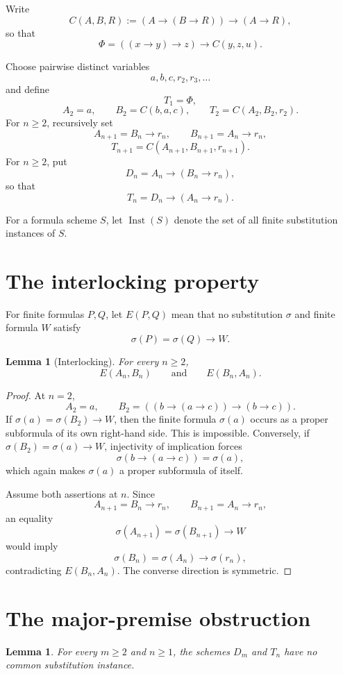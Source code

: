 \documentclass[11pt]{article}
\newtheorem{lemma}[theorem]{Lemma}
\newcommand{\Imp}{\mathbin{\to}}
\newcommand{\Inst}{\operatorname{Inst}}
\begin{document}
Write
\[
C(A,B,R):=(A\Imp(B\Imp R))\Imp(A\Imp R),
\]
so that
\[
\Phi=((x\Imp y)\Imp z)\Imp C(y,z,u).
\]

Choose pairwise distinct variables
\[
a,b,c,r_2,r_3,\ldots
\]
and define
\[
T_1=\Phi,
\]
\[
A_2=a,\qquad B_2=C(b,a,c),\qquad T_2=C(A_2,B_2,r_2).
\]
For $n\ge2$, recursively set
\[
A_{n+1}=B_n\Imp r_n,\qquad
B_{n+1}=A_n\Imp r_n,
\]
\[
T_{n+1}=C(A_{n+1},B_{n+1},r_{n+1}).
\]
For $n\ge2$, put
\[
D_n=A_n\Imp(B_n\Imp r_n),
\]
so that
\[
T_n=D_n\Imp(A_n\Imp r_n).
\]

For a formula scheme $S$, let $\Inst(S)$ denote the set of all finite
substitution instances of $S$.

\section{\hspace{0.35em}The interlocking property}

For finite formulas $P,Q$, let $E(P,Q)$ mean that no substitution $\sigma$
and finite formula $W$ satisfy
\[
\sigma(P)=\sigma(Q)\Imp W.
\]

\begin{lemma}[Interlocking]\label{lem:interlocking}
For every $n\ge2$,
\[
E(A_n,B_n)\qquad\text{and}\qquad E(B_n,A_n).
\]
\end{lemma}

\begin{proof}
At $n=2$,
\[
A_2=a,\qquad
B_2=((b\Imp(a\Imp c))\Imp(b\Imp c)).
\]
If $\sigma(a)=\sigma(B_2)\Imp W$, then the finite formula
$\sigma(a)$ occurs as a proper subformula of its own right-hand side.
This is impossible.  Conversely, if $\sigma(B_2)=\sigma(a)\Imp W$, injectivity
of implication forces
\[
\sigma(b\Imp(a\Imp c))=\sigma(a),
\]
which again makes $\sigma(a)$ a proper subformula of itself.

Assume both assertions at $n$.  Since
\[
A_{n+1}=B_n\Imp r_n,\qquad
B_{n+1}=A_n\Imp r_n,
\]
an equality
\[
\sigma(A_{n+1})=\sigma(B_{n+1})\Imp W
\]
would imply
\[
\sigma(B_n)=\sigma(A_n)\Imp\sigma(r_n),
\]
contradicting $E(B_n,A_n)$.  The converse direction is symmetric.
\end{proof}

\section{The major-premise obstruction}

\begin{lemma}\label{lem:major}
For every $m\ge2$ and $n\ge1$, the schemes $D_m$ and $T_n$
have no common substitution instance.
\end{lemma}
\end{document}
